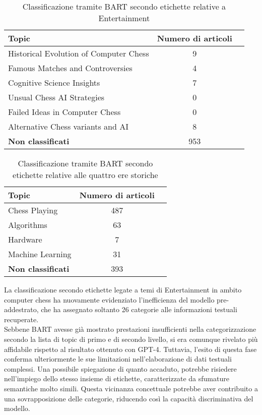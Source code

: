 \begin{table}[H]
    \centering
    \begin{tabular}{l|cc|}
        \hline
        \textbf{Topic} & \textbf{Numero di articoli} \\
        \hline
        Historical Evolution of Computer Chess & 9 \\
        Famous Matches and Controversies & 4 \\
        Cognitive Science Insights & 7 \\
        Unsual Chess AI Strategies & 0 \\
        Failed Ideas in Computer Chess & 0 \\
        Alternative Chess variants and AI & 8 \\
        \hline
        \textbf{Non classificati} & 953 \\
    \end{tabular}
    \caption{Classificazione tramite BART secondo etichette relative a Entertainment}
\end{table}
\begin{table}[H]
    \centering
    \begin{tabular}{l|cc|}
        \hline
        \textbf{Topic} & \textbf{Numero di articoli} \\
        \hline
        Chess Playing & 487 \\
        Algorithms & 63 \\
        Hardware & 7 \\
        Machine Learning & 31 \\
        \hline
        \textbf{Non classificati} & 393 \\
    \end{tabular}
    \caption{Classificazione tramite BART secondo etichette relative alle quattro ere storiche}
\end{table}
La classificazione secondo etichette legate a temi di Entertainment in ambito computer chess ha nuovamente evidenziato l'inefficienza del modello pre-addestrato, che ha assegnato soltanto 26 categorie alle informazioni testuali recuperate. \vspace{7pt} \\
Sebbene BART avesse già mostrato prestazioni insufficienti nella categorizzazione secondo la lista di topic di primo e di secondo livello, si era comunque rivelato più affidabile rispetto al risultato ottenuto con GPT-4. Tuttavia, l'esito di questa fase conferma ulteriormente le sue limitazioni nell'elaborazione di dati testuali complessi. Una possibile spiegazione di quanto accaduto, potrebbe risiedere nell'impiego dello stesso insieme di etichette, caratterizzate da sfumature semantiche molto simili. Questa vicinanza concettuale potrebbe aver contribuito a una sovrapposizione delle categorie, riducendo così la capacità discriminativa del modello. \vspace{7pt} \\
